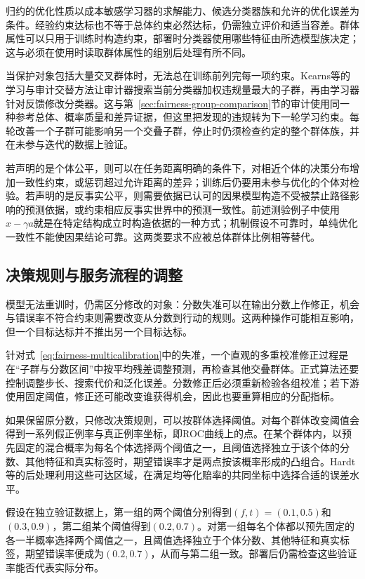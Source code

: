 归约的优化性质以成本敏感学习器的求解能力、候选分类器族和允许的优化误差为条件。经验约束达标也不等于总体约束必然达标，仍需独立评价和适当容差。群体属性可以只用于训练时构造约束，部署时分类器使用哪些特征由所选模型族决定；这与必须在使用时读取群体属性的组别后处理有所不同。

当保护对象包括大量交叉群体时，无法总在训练前列完每一项约束。Kearns等的学习与审计交替方法让审计器搜索当前分类器加权违规量最大的子群，再由学习器针对反馈修改分类器。这与第~\ref{sec:fairness-group-comparison}节的审计使用同一种参考总体、概率质量和差异证据，但这里把发现的违规转为下一轮学习约束。每轮改善一个子群可能影响另一个交叠子群，停止时仍须检查约定的整个群体族，并在未参与迭代的数据上验证。

若声明的是个体公平，则可以在任务距离明确的条件下，对相近个体的决策分布增加一致性约束，或惩罚超过允许距离的差异；训练后仍要用未参与优化的个体对检验。若声明的是反事实公平，则需要依据已认可的因果模型构造不受被禁止路径影响的预测依据，或约束相应反事实世界中的预测一致性。前述测验例子中使用$x-\gamma a$就是在特定结构成立时构造依据的一种方式；机制假设不可靠时，单纯优化一致性不能使因果结论可靠。这两类要求不应被总体群体比例相等替代。

\subsection{决策规则与服务流程的调整}
\label{sec:fairness-decision-intervention}

模型无法重训时，仍需区分修改的对象：分数失准可以在输出分数上作修正，机会与错误率不符合约束则需要改变从分数到行动的规则。这两种操作可能相互影响，但一个目标达标并不推出另一个目标达标。

针对式~\eqref{eq:fairness-multicalibration}中的失准，一个直观的多重校准修正过程是在“子群与分数区间”中按平均残差调整预测，再检查其他交叠群体。正式算法还要控制调整步长、搜索代价和泛化误差。分数修正后必须重新检验各组校准；若下游使用固定阈值，修正还可能改变谁获得机会，因此也要重算相应的分配指标。

如果保留原分数，只修改决策规则，可以按群体选择阈值。对每个群体改变阈值会得到一系列假正例率与真正例率坐标，即ROC曲线上的点。在某个群体内，以预先固定的混合概率为每名个体选择两个阈值之一，且阈值选择独立于该个体的分数、其他特征和真实标签时，期望错误率才是两点按该概率形成的凸组合。Hardt等的后处理利用这些可达区域，在满足均等化赔率的共同坐标中选择合适的误差水平。

\begin{example}[随机化如何补出共同错误率]
\label{ex:fairness-random-threshold}
假设在独立验证数据上，第一组的两个阈值分别得到$(f,t)=(0.1,0.5)$和$(0.3,0.9)$，第二组某个阈值得到$(0.2,0.7)$。对第一组每名个体都以预先固定的各一半概率选择两个阈值之一，且阈值选择独立于个体分数、其他特征和真实标签，期望错误率便成为$(0.2,0.7)$，从而与第二组一致。部署后仍需检查这些验证率能否代表实际分布。
\end{example}


